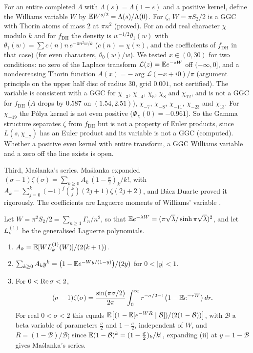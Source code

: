 \begin{remark}\label{rem:ch19:gammaarith}
For an entire completed $\Lambda$ with $\Lambda(s)=\Lambda(1-s)$ and a positive kernel, define the Williams variable $W$ by $\mathbb{E} W^{s/2}=\Lambda(s)/\Lambda(0)$. For $\zeta$, $W=\pi S_2/2$ is a GGC with Thorin atoms of mass $2$ at $\pi n^2$ (proved). For an odd real character $\chi$ modulo $k$ and for $f_{\mathrm{DH}}$ the density is $w^{-1/2}\theta_1(w)$ with $\theta_1(w)=\sum c(n)n\,e^{-\pi n^2w/k}$ ($c(n)=\chi(n)$, and the coefficients of $f_{\mathrm{DH}}$ in that case) (for even characters, $\theta_0(w)/w$). We tested $x\in(0,30)$ for two conditions: no zero of the Laplace transform $\mathcal L(z)=\mathbb{E} e^{-zW}$ off $(-\infty,0]$, and a nondecreasing Thorin function $A(x)=-\arg\mathcal L(-x+i0)/\pi$ (argument principle on the upper half disc of radius $30$, grid $0.001$, not certified). The variable is consistent with a GGC for $\chi_{-3}$, $\chi_{-4}$, $\chi_5$, $\chi_8$ and $\chi_{12}$, and is not a GGC for $f_{\mathrm{DH}}$ ($A$ drops by $0.587$ on $(1.54,2.51)$), $\chi_{-7}$, $\chi_{-8}$, $\chi_{-11}$, $\chi_{-23}$ and $\chi_{13}$. For $\chi_{-19}$ the P\'olya kernel is not even positive ($\Phi_\chi(0)=-0.961$). So the Gamma structure separates $\zeta$ from $f_{\mathrm{DH}}$ but is not a property of Euler products, since $L(s,\chi_{-7})$ has an Euler product and its variable is not a GGC (computed). Whether a positive even kernel with entire transform, a GGC Williams variable and a zero off the line exists is open.
\end{remark}

Third, Ma\'slanka's series. Ma\'slanka \cite{Maslanka01} expanded $(\sigma-1)\zeta(\sigma)=\sum_{k\ge0}A_k\,(1-\frac\sigma2)_k/k!$, with $A_k=\sum_{j=0}^k(-1)^j\binom kj(2j+1)\zeta(2j+2)$, and B\'aez Duarte \cite{BaezDuarte10} proved it rigorously. The coefficients are Laguerre moments of Williams' variable \cite{PolsonRXi26}.

\begin{proposition}\label{prop:ch19:maslanka}
Let $W=\pi^2S_2/2=\sum_{n\ge1}\Gamma_n/n^2$, so that $\mathbb{E} e^{-\lambda W}=(\pi\sqrt\lambda/\sinh\pi\sqrt\lambda)^2$, and let $L^{(1)}_k$ be the generalised Laguerre polynomials.
\begin{enumerate}
\item[(i)] $A_k=\mathbb{E}[W L^{(1)}_k(W)]/(2(k+1))$.
\item[(ii)] $\sum_{k\ge0}A_ky^k=\bigl(1-\mathbb{E} e^{-Wy/(1-y)}\bigr)/(2y)$ for $0<|y|<1$.
\item[(iii)] For $0<\operatorname{Re}\sigma<2$,
\[
(\sigma-1)\zeta(\sigma)=\frac{\sin(\pi\sigma/2)}{2\pi}\int_0^\infty r^{-\sigma/2-1}\bigl(1-\mathbb{E} e^{-rW}\bigr)\,dr .
\]
For real $0<\sigma<2$ this equals $\mathbb{E}\bigl[(1-\mathbb{E}[e^{-WR}\mid \mathcal B])/(2(1-\mathcal B))\bigr]$, with $\mathcal B$ a beta variable of parameters $\frac\sigma2$ and $1-\frac\sigma2$, independent of $W$, and $R=(1-\mathcal B)/\mathcal B$; since $\mathbb{E}(1-\mathcal B)^k=(1-\frac\sigma2)_k/k!$, expanding (ii) at $y=1-\mathcal B$ gives Ma\'slanka's series.
\end{enumerate}
\end{proposition}

